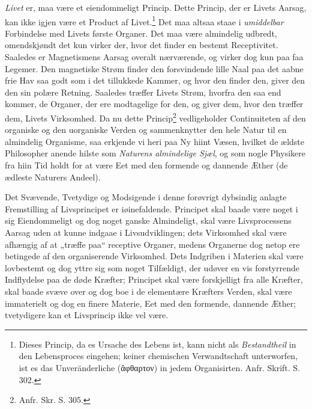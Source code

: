 \documentclass[12pt,a4paper]{book}
\begin{document}
\emph{Livet} er, maa være et eiendommeligt Princip. Dette Princip, der er
Livets Aarsag, kan ikke igjen være et Product af
Livet.\footnote{%
Dieses Princip, da es Ursache des Lebens ist, kann nicht als
\emph{Bestandtheil} in den Lebensproces eingehen; keiner chemischen
Verwandtschaft unterworfen, ist es das Unveränderliche (ἄφθαρτον) in jedem
Organisirten. Anfr. Skrift. S. 302.}
Det maa altsaa
staae i \emph{umiddelbar} Forbindelse med Livets første Organer. Det maa være
almindelig udbredt, omendskjøndt det kun virker der, hvor det finder en bestemt
Receptivitet. Saaledes er Magnetismens Aarsag overalt nærværende, og virker dog
kun paa faa Legemer. Den magnetiske Strøm finder den forsvindende lille Naal
paa det aabne frie Hav saa godt som i det tillukkede Kammer, og hvor den finder
den, giver den den sin polære Retning. Saaledes træffer Livets Strøm, hvorfra
den saa end kommer, de Organer, der ere modtagelige for den, og giver dem, hvor
den træffer dem, Livets Virksomhed. Da nu dette
Princip\footnote{%
Anfr. Skr. S. 305.}
vedligeholder Continuiteten af den organiske og den uorganiske Verden og
sammenknytter den hele Natur til en almindelig Organisme, saa erkjende vi heri
paa Ny hiint Væsen, hvilket de ældste Philosopher anende hilste som
\emph{Naturens almindelige Sjæl}, og som nogle Physikere fra hiin Tid holdt for
at være Eet med den formende og dannende Æther (de ædleste Naturers Andeel).

Det Svævende, Tvetydige og Modsigende i denne forøvrigt dybsindig anlagte
Fremstilling af Livsprincipet er iøinefaldende. Principet skal baade være noget
i sig Eiendommeligt og dog noget ganske Almindeligt, skal være Livsprocessens
Aarsag uden at kunne indgaae i Livsudviklingen; dets Virksomhed skal være
afhængig af at „træffe paa“ receptive Organer, medens Organerne dog netop ere
betingede af den organiserende Virksomhed. Dets Indgriben i Materien skal være
lovbestemt og dog yttre sig som noget Tilfældigt, der udøver en vis forstyrrende
Indflydelse paa de døde Kræfter;
Principet skal være forskjelligt fra alle Kræfter, skal baade svæve over og dog
boe i de elementære Kræfters Verden, skal være immaterielt og dog en finere
Materie, Eet med den formende, dannende Æther; tvetydigere kan et Livsprincip
ikke vel være.
\end{document}
